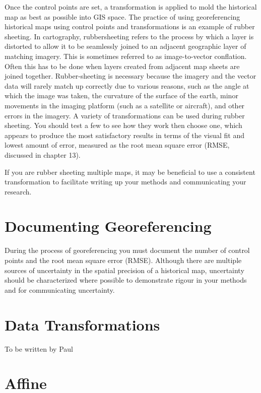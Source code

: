 \documentclass[
]{book}
\begin{document}
Once the control points are set, a transformation is applied to mold the historical map as best as possible into GIS space. The practice of using georeferencing historical maps using control points and transformations is an example of rubber sheeting. In cartography, rubbersheeting refers to the process by which a layer is distorted to allow it to be seamlessly joined to an adjacent geographic layer of matching imagery. This is sometimes referred to as image-to-vector conflation. Often this has to be done when layers created from adjacent map sheets are joined together. Rubber-sheeting is necessary because the imagery and the vector data will rarely match up correctly due to various reasons, such as the angle at which the image was taken, the curvature of the surface of the earth, minor movements in the imaging platform (such as a satellite or aircraft), and other errors in the imagery. A variety of transformations can be used during rubber sheeting. You should test a few to see how they work then choose one, which appears to produce the most satisfactory results in terms of the visual fit and lowest amount of error, measured as the root mean square error (RMSE, discussed in chapter 13).

If you are rubber sheeting multiple maps, it may be beneficial to use a consistent transformation to facilitate writing up your methods and communicating your research.

\hypertarget{documenting-georeferencing}{%
\section{Documenting Georeferencing}\label{documenting-georeferencing}}

During the process of georeferencing you must document the number of control points and the root mean square error (RMSE). Although there are multiple sources of uncertainty in the spatial precision of a historical map, uncertainty should be characterized where possible to demonstrate rigour in your methods and for communicating uncertainty.

\hypertarget{data-transformations}{%
\section{Data Transformations}\label{data-transformations}}

To be written by Paul

\hypertarget{affine}{%
\section{Affine}\label{affine}}
\end{document}
